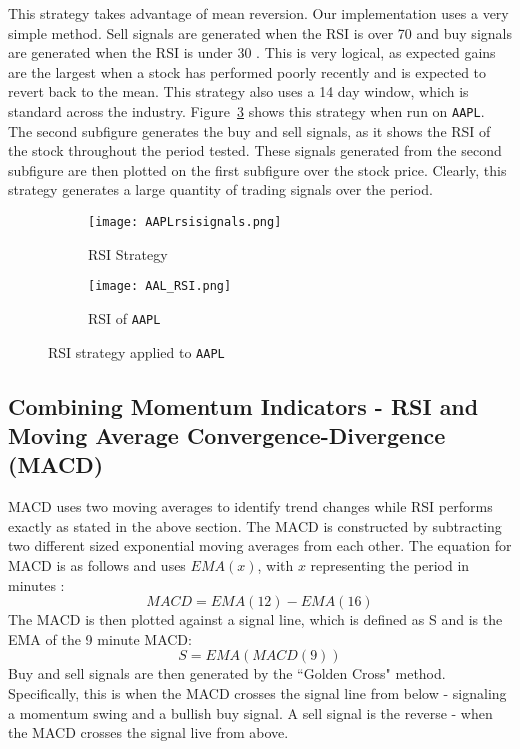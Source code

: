 \documentclass[../thesis.tex]{subfiles}
\begin{document}
This strategy takes advantage of mean reversion. Our implementation uses a very simple method. Sell signals are generated when the RSI is over 70 and buy signals are generated when the RSI is under 30 \cite{Chong2014}. This is very logical, as expected gains are the largest when a stock has performed poorly recently and is expected to revert back to the mean. This strategy also uses a 14 day window, which is standard across the industry. Figure~\ref{RSIfigure} shows this strategy when run on \texttt{AAPL}. The second subfigure generates the buy and sell signals, as it shows the RSI of the stock throughout the period tested. These signals generated from the second subfigure are then plotted on the first subfigure over the stock price. Clearly, this strategy generates a large quantity of trading signals over the period.

\begin{figure}[h]
\centering

\begin{subfigure}[t]{0.45\textwidth}
\texttt{[image: AAPLrsisignals.png]}
\caption{RSI Strategy \label{overflow}}
\end{subfigure}
\begin{subfigure}[t]{0.45\textwidth}
\texttt{[image: AAL\_RSI.png]}
\caption{ RSI of \texttt{AAPL} \label{overflow}}
\end{subfigure}

\caption{RSI strategy applied to \texttt{AAPL}  \label{overflow}}
\label{RSIfigure}
\end{figure}

\subsection{Combining Momentum Indicators - RSI and Moving Average Convergence-Divergence (MACD)}

MACD uses two moving averages to identify trend changes while RSI performs exactly as stated in the above section. The MACD is constructed by subtracting two different sized exponential moving averages from each other. The equation for MACD is as follows and uses $EMA(x)$, with $x$ representing the period in minutes \cite{Chong2014}: \[ MACD = EMA(12) - EMA(16)\] The MACD is then plotted against a signal line, which is defined as S and is the EMA of the 9 minute MACD: \[ S = EMA(MACD(9)) \] Buy and sell signals are then generated by the ``Golden Cross" method. Specifically, this is when the MACD crosses the signal line from below - signaling a momentum swing and a bullish buy signal. A sell signal is the reverse - when the MACD crosses the signal live from above.
\end{document}
